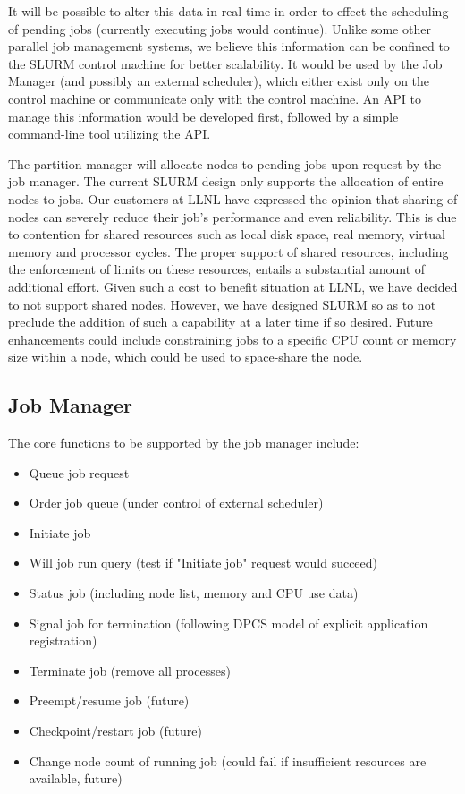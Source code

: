 It will be possible to alter this data in real-time in order to effect the
scheduling of pending jobs (currently executing jobs would continue). Unlike some
other parallel job management systems, we believe this information can be
confined to the SLURM control machine for better scalability. It would be used
by the Job Manager (and possibly an external scheduler), which either exist only 
on the control machine or communicate only with the control machine. An API to 
manage this information would be developed first, followed by a simple command-line 
tool utilizing the API.

The partition manager will allocate nodes to pending jobs upon request by 
the job manager. 
The current SLURM design only supports the allocation of entire nodes to 
jobs. Our customers at LLNL have expressed the opinion that sharing of 
nodes can severely reduce their job's performance and even reliability. 
This is due to contention for shared resources such as local disk space, 
real memory, virtual memory and processor cycles. The proper support of 
shared resources, including the enforcement of limits on these resources, 
entails a substantial amount of additional effort. Given such a cost to 
benefit situation at LLNL, we have decided to not support shared nodes. 
However, we have designed SLURM so as to not preclude the addition of 
such a capability at a later time if so desired.
Future enhancements could include constraining jobs to a specific CPU count 
or memory size within a node, which could be used to space-share the node.

\subsection{Job Manager}

The core functions to be supported by the job manager include:
\begin{itemize}
\item Queue job request
\item Order job queue (under control of external scheduler)
\item Initiate job
\item Will job run query (test if "Initiate job" request would succeed)
\item Status job (including node list, memory and CPU use data)
\item Signal job for termination (following DPCS model of explicit application
registration)
\item Terminate job (remove all processes)
\item Preempt/resume job  (future)
\item Checkpoint/restart job (future)
\item Change node count of running job (could fail if insufficient resources are 
available, future)
\end{itemize}

